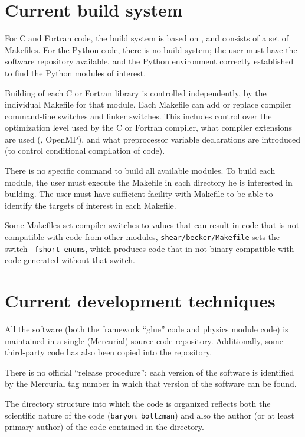 \documentclass[draftmode,draftwater]{memarticle}
\newcommand{\prog}[1]%
  {\texttt{#1}}
\newcommand{\despipe}{\name{des-pipe}\xspace}
\begin{document}
\section{Current build system}

For C and Fortran code, the \despipe build system is based on
, and consists of a set of Makefiles. For the Python code,
there is no build system; the user must have the software repository
available, and the Python environment correctly established to find the
Python modules of interest.

Building of each C or Fortran library is controlled independently, by
the individual Makefile for that module. Each Makefile can add or
replace compiler command-line switches and linker switches. This
includes control over the optimization level used by the C or Fortran
compiler, what compiler extensions are used (\eg, OpenMP), and what
preprocessor variable declarations are introduced (to control
conditional compilation of code).

There is no specific command to build all available modules. To build
each module, the user must execute the Makefile in each directory he is
interested in building. The user must have sufficient facility with
Makefile to be able to identify the targets of interest in each
Makefile.

Some Makefiles set compiler switches to values that can result in code
that is not compatible with code from other modules, \eg
\prog{shear/becker/Makefile} sets the switch \texttt{-fshort-enums},
which produces code that in not binary-compatible with code generated
without that switch.

\section{Current development techniques}

All the \despipe software (both the framework ``glue'' code and
physics module code) is maintained in a single (Mercurial) source code
repository. Additionally, some third-party code has also been copied
into the \despipe repository.

There is no official ``release procedure''; each version of the software
is identified by the Mercurial tag number in which that version of the
software can be found.

The directory structure into which the code is organized reflects both
the scientific nature of the code (\eg \prog{baryon}, \prog{boltzman})
and also the author (or at least primary author) of the code contained
in the directory.
\end{document}
